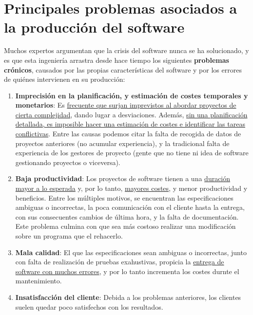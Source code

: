 \section{Principales problemas asociados a la producción del software}
Muchos expertos argumentan que la crisis del software nunca se ha solucionado, y es que esta ingeniería arrastra desde hace tiempo los siguientes \textbf{problemas crónicos}, causados por las propias características del software y por los errores de quiénes intervienen en su producción:
\begin{enumerate}
    \item \textbf{Imprecisión en la planificación, y estimación de costes temporales y monetarios}: Es \uline{frecuente que surjan imprevistos al abordar proyectos de cierta complejidad}, dando lugar a desviaciones. Además, \uline{sin una planificación detallada, es imposible hacer una estimación de costes e identificar las tareas conflictivas}. Entre las causas podemos citar la falta de recogida de datos de proyectos anteriores (no acumular experiencia), y la tradicional falta de experiencia de los gestores de proyecto (gente que no tiene ni idea de software gestionando proyectos o viceversa).
    \item \textbf{Baja productividad}: Los proyectos de software tienen a una \uline{duración mayor a lo esperada} y, por lo tanto, \uline{mayores costes}, y menor productividad y beneficios. Entre los múltiples motivos, se encuentran las especificaciones ambiguas o incorrectas, la poca comunicación con el cliente hasta la entrega, con sus consecuentes cambios de última hora, y la falta de documentación. Este problema culmina con que sea más costoso realizar una modificación sobre un programa que el rehacerlo.
    \item \textbf{Mala calidad}: El que las especificaciones sean ambiguas o incorrectas, junto con falta de realización de pruebas exahustivas, propicia la \uline{entrega de software con muchos errores}, y por lo tanto incrementa los costes durnte el mantenimiento.
    \item \textbf{Insatisfacción del cliente}: Debida a los problemas anteriores, los clientes suelen quedar poco satisfechos con los resultados.
\end{enumerate}